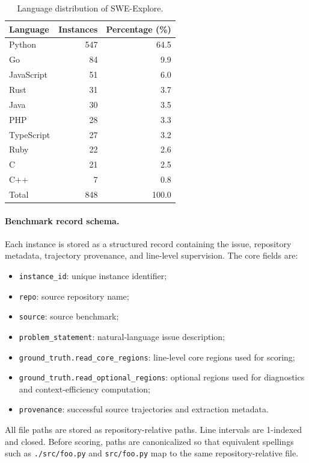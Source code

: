 \begin{table}[h]
\centering
\caption{Language distribution of SWE-Explore.}
\label{tab:language_distribution}
\begin{tabular}{lrr}
\toprule
Language & Instances & Percentage (\%) \\
\midrule
Python & 547 & 64.5 \\
Go & 84 & 9.9 \\
JavaScript & 51 & 6.0 \\
Rust & 31 & 3.7 \\
Java & 30 & 3.5 \\
PHP & 28 & 3.3 \\
TypeScript & 27 & 3.2 \\
Ruby & 22 & 2.6 \\
C & 21 & 2.5 \\
C++ & 7 & 0.8 \\
\midrule
Total & 848 & 100.0 \\
\bottomrule
\end{tabular}
\end{table}

\paragraph{Benchmark record schema.}
Each instance is stored as a structured record containing the issue, repository
metadata, trajectory provenance, and line-level supervision. The core fields are:
\begin{itemize}
    \item \texttt{instance\_id}: unique instance identifier;
    \item \texttt{repo}: source repository name;
    \item \texttt{source}: source benchmark;
    \item \texttt{problem\_statement}: natural-language issue description;
    \item \texttt{ground\_truth.read\_core\_regions}: line-level core regions used for scoring;
    \item \texttt{ground\_truth.read\_optional\_regions}: optional regions used for diagnostics and context-efficiency computation;
    \item \texttt{provenance}: successful source trajectories and extraction metadata.
\end{itemize}
All file paths are stored as repository-relative paths. Line intervals are
1-indexed and closed. Before scoring, paths are canonicalized so that equivalent
spellings such as \texttt{./src/foo.py} and \texttt{src/foo.py} map to the same
repository-relative file.

